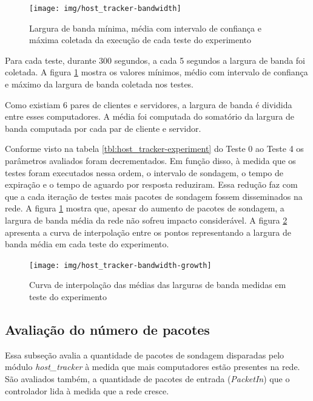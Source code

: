 \begin{figure}[!htb]
    \centering
    \label{fig:host_tracker-bandwidth}
    \texttt{[image: img/host\_tracker-bandwidth]}
    \caption{Largura de banda mínima, média com intervalo de confiança e máxima
    coletada da execução de cada teste do experimento}
\end{figure}

Para cada teste, durante 300 segundos, a cada 5 segundos a largura de banda
foi coletada.
A figura \ref{fig:host_tracker-bandwidth} mostra os valores mínimos, médio
com intervalo de confiança e máximo da largura de banda coletada nos testes.

Como existiam 6 pares de clientes e servidores, a largura de banda é
dividida entre esses computadores.
A média foi computada do somatório da largura de banda computada por cada
par de cliente e servidor.

Conforme visto na tabela \ref{tbl:host_tracker-experiment} do Teste 0 ao
Teste 4 os parâmetros avaliados foram decrementados.
Em função disso, à medida que os testes foram executados nessa ordem,
o intervalo de sondagem, o tempo de expiração e o tempo de aguardo por
resposta reduziram.
Essa redução faz com que a cada iteração de testes mais pacotes de sondagem
fossem disseminados na rede.
A figura \ref{fig:host_tracker-bandwidth} mostra que, apesar do aumento de
pacotes de sondagem, a largura de banda média da rede não sofreu impacto
considerável.
A figura \ref{fig:host_tracker-bandwidth-growth} apresenta a curva de
interpolação entre os pontos representando a largura de banda média em cada
teste do experimento.

\begin{figure}[!htb]
    \centering
    \label{fig:host_tracker-bandwidth-growth}
    \texttt{[image: img/host\_tracker-bandwidth-growth]}
    \caption{Curva de interpolação das médias das larguras de banda medidas
    em teste do experimento}
\end{figure}

\subsection{Avaliação do número de pacotes}

Essa subseção avalia a quantidade de pacotes de sondagem disparadas pelo
módulo \emph{host\_tracker} à medida que mais computadores estão presentes
na rede.
São avaliados também, a quantidade de pacotes de entrada (\emph{PacketIn})
que o controlador lida à medida que a rede cresce.

